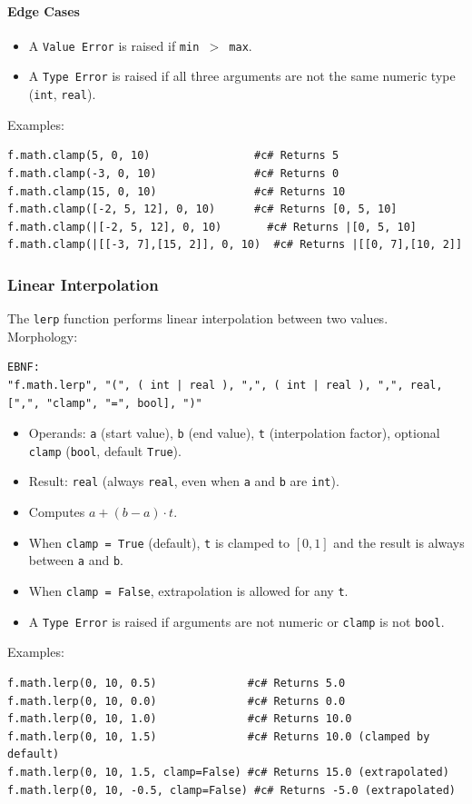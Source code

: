\paragraph{Edge Cases}
\begin{itemize}
\item A \texttt{Value Error} is raised if \texttt{min $>$ max}.
\item A \texttt{Type Error} is raised if all three arguments are not the same numeric type (\texttt{int}, \texttt{real}).
\end{itemize}
Examples:
\begin{verbatim}
f.math.clamp(5, 0, 10)                #c# Returns 5
f.math.clamp(-3, 0, 10)               #c# Returns 0
f.math.clamp(15, 0, 10)               #c# Returns 10
f.math.clamp([-2, 5, 12], 0, 10)      #c# Returns [0, 5, 10]
f.math.clamp(|[-2, 5, 12], 0, 10)       #c# Returns |[0, 5, 10]
f.math.clamp(|[[-3, 7],[15, 2]], 0, 10)  #c# Returns |[[0, 7],[10, 2]]
\end{verbatim}

\subsubsection{Linear Interpolation}
The \texttt{lerp} function performs linear interpolation between two values. \\
Morphology:
\begin{verbatim}
EBNF:
"f.math.lerp", "(", ( int | real ), ",", ( int | real ), ",", real, [",", "clamp", "=", bool], ")"
\end{verbatim}
\begin{itemize}
\item Operands: \texttt{a} (start value), \texttt{b} (end value), \texttt{t} (interpolation factor), optional \texttt{clamp} (\texttt{bool}, default \texttt{True}).
\item Result: \texttt{real} (always \texttt{real}, even when \texttt{a} and \texttt{b} are \texttt{int}).
\item Computes $a + (b - a) \cdot t$.
\item When \texttt{clamp = True} (default), \texttt{t} is clamped to $[0, 1]$ and the result is always between \texttt{a} and \texttt{b}.
\item When \texttt{clamp = False}, extrapolation is allowed for any \texttt{t}.
\item A \texttt{Type Error} is raised if arguments are not numeric or \texttt{clamp} is not \texttt{bool}.
\end{itemize}
Examples:
\begin{verbatim}
f.math.lerp(0, 10, 0.5)              #c# Returns 5.0
f.math.lerp(0, 10, 0.0)              #c# Returns 0.0
f.math.lerp(0, 10, 1.0)              #c# Returns 10.0
f.math.lerp(0, 10, 1.5)              #c# Returns 10.0 (clamped by default)
f.math.lerp(0, 10, 1.5, clamp=False) #c# Returns 15.0 (extrapolated)
f.math.lerp(0, 10, -0.5, clamp=False) #c# Returns -5.0 (extrapolated)
\end{verbatim}

